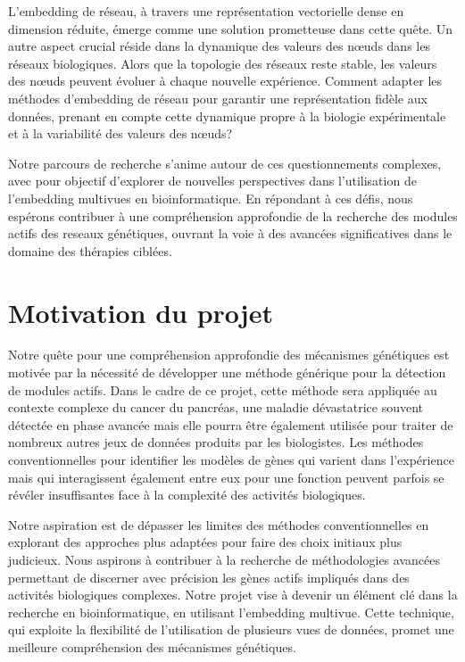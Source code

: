 L'embedding de réseau, à travers une représentation vectorielle dense en dimension réduite, émerge comme une solution prometteuse dans cette quête. Un autre aspect crucial réside dans la dynamique des valeurs des nœuds dans les réseaux biologiques. Alors que la topologie des réseaux reste stable, les valeurs des nœuds peuvent évoluer à chaque nouvelle expérience. Comment adapter les méthodes d'embedding de réseau pour garantir une représentation fidèle aux données, prenant en compte cette dynamique propre à la biologie expérimentale et à la variabilité des valeurs des nœuds?


Notre parcours de recherche s'anime autour de ces questionnements complexes, avec pour objectif d'explorer de nouvelles perspectives dans l'utilisation de l'embedding multivues en bioinformatique. En répondant à ces défis, nous espérons contribuer à une compréhension approfondie de la recherche  des modules actifs des reseaux  génétiques, ouvrant la voie à des avancées significatives dans le domaine des thérapies ciblées.



\section{Motivation du projet }

Notre  quête pour une compréhension approfondie des mécanismes génétiques est motivée par la nécessité de développer une méthode générique pour la détection de modules actifs. Dans le cadre de ce projet, cette méthode sera appliquée au contexte complexe du cancer du pancréas, une maladie dévastatrice souvent détectée en phase avancée mais elle pourra être également utilisée pour traiter de nombreux autres jeux de données produits par les biologistes. Les méthodes conventionnelles pour identifier les modèles de gènes qui varient dans l'expérience mais qui interagissent également entre eux pour une fonction peuvent parfois se révéler insuffisantes face à la complexité des activités biologiques.

Notre aspiration est de dépasser les limites des méthodes conventionnelles en explorant des approches plus adaptées pour faire des choix initiaux plus judicieux. Nous aspirons à contribuer à la recherche de méthodologies avancées permettant de discerner avec précision les gènes actifs impliqués dans des activités biologiques complexes. Notre projet vise à devenir un élément clé dans la recherche en bioinformatique, en utilisant l'embedding multivue. Cette technique, qui exploite la flexibilité de l'utilisation de plusieurs vues de données, promet une meilleure compréhension des mécanismes génétiques.

